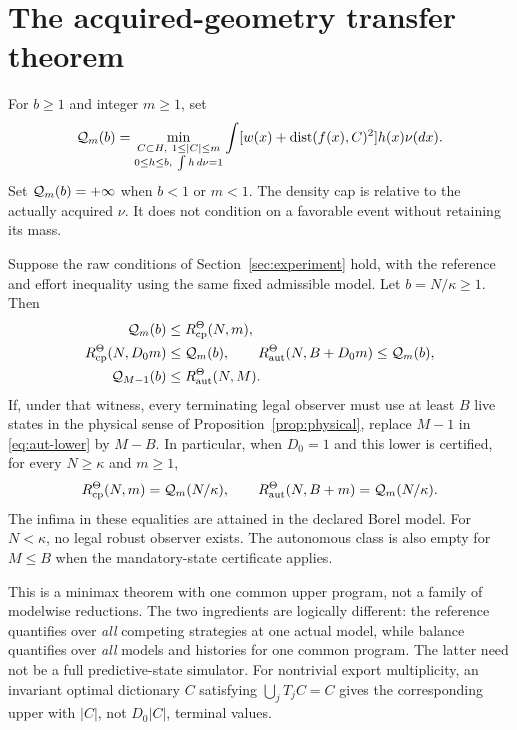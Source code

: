 \section{The acquired-geometry transfer theorem}
For $b\ge1$ and integer $m\ge1$, set
\begin{equation}\label{eq:profile}
 \mathcal Q_m(b)=\min_{\substack{C\subset H,\ 1\le|C|\le m\\
                    0\le h\le b,\ \int h\,d\nu=1}}
             \int [w(x)+\operatorname{dist}(f(x),C)^2]h(x)\nu(dx).
\end{equation}
Set $\mathcal Q_m(b)=+\infty$ when $b<1$ or $m<1$. The density cap is relative to the actually acquired $\nu$. It does not condition on a favorable event without retaining its mass.

\begin{theorem}\label{thm:main}
Suppose the raw conditions of Section~\ref{sec:experiment} hold, with the reference and effort inequality using the same fixed admissible model. Let $b=N/\kappa\ge1$. Then
\begin{align}
 \mathcal Q_m(b)&\le R_{\mathrm{cp}}^\Theta(N,m),\label{eq:cp-lower}\\
 R_{\mathrm{cp}}^\Theta(N,D_0m)&\le\mathcal Q_m(b),\qquad
 R_{\mathrm{aut}}^\Theta(N,B+D_0m)\le\mathcal Q_m(b),\label{eq:upper}\\
 \mathcal Q_{M-1}(b)&\le R_{\mathrm{aut}}^\Theta(N,M).\label{eq:aut-lower}
\end{align}
If, under that witness, every terminating legal observer must use at least $B$ live states in the physical sense of Proposition~\ref{prop:physical}, replace $M-1$ in \eqref{eq:aut-lower} by $M-B$. In particular, when $D_0=1$ and this lower is certified, for every $N\ge\kappa$ and $m\ge1$,
\begin{equation}\label{eq:exact}
 R_{\mathrm{cp}}^\Theta(N,m)=\mathcal Q_m(N/\kappa),\qquad
 R_{\mathrm{aut}}^\Theta(N,B+m)=\mathcal Q_m(N/\kappa).
\end{equation}
The infima in these equalities are attained in the declared Borel model. For $N<\kappa$, no legal robust observer exists. The autonomous class is also empty for $M\le B$ when the mandatory-state certificate applies.
\end{theorem}

This is a minimax theorem with one common upper program, not a family of modelwise reductions. The two ingredients are logically different: the reference quantifies over \emph{all} competing strategies at one actual model, while balance quantifies over \emph{all} models and histories for one common program. The latter need not be a full predictive-state simulator. For nontrivial export multiplicity, an invariant optimal dictionary $C$ satisfying $\bigcup_jT_jC=C$ gives the corresponding upper with $|C|$, not $D_0|C|$, terminal values.

